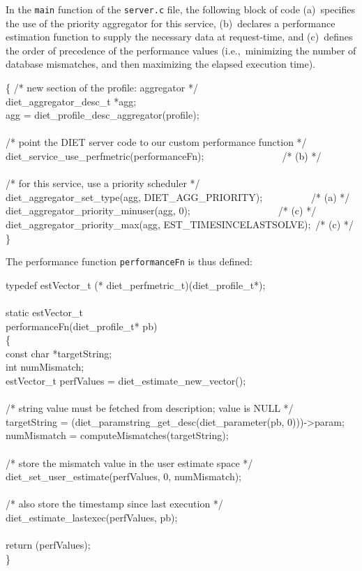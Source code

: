 In the \texttt{main} function of the \texttt{server.c} file, the
following block of code (a)~specifies the use of the priority
aggregator for this service, (b)~declares a performance estimation
function to supply the necessary data at request-time, and
(c)~defines the order of precedence of the performance values
(i.e.,~minimizing the number of database mismatches, and then
maximizing the elapsed execution time).
\begin{code}
  \{
    /* new section of the profile: aggregator */ \\
    diet\_aggregator\_desc\_t *agg; \\
    agg = diet\_profile\_desc\_aggregator(profile); \\
\\
    /* point the DIET server code to our custom performance function */ \\
    diet\_service\_use\_perfmetric(performanceFn);~~~~~~~~~~~~~~~~/* (b) */ \\
\\
    /* for this service, use a priority scheduler */ \\
    diet\_aggregator\_set\_type(agg, DIET\_AGG\_PRIORITY);~~~~~~~~~~/* (a) */ \\
    diet\_aggregator\_priority\_minuser(agg, 0);~~~~~~~~~~~~~~~~~~/* (c) */ \\
    diet\_aggregator\_priority\_max(agg, EST\_TIMESINCELASTSOLVE);~/* (c) */ \\
  \}
\end{code}
The performance function \texttt{performanceFn} is thus defined:
\begin{code}
typedef estVector\_t (* diet\_perfmetric\_t)(diet\_profile\_t*); \\
\\
static estVector\_t \\
performanceFn(diet\_profile\_t* pb) \\
\{ \\
  const char *targetString; \\
  int numMismatch; \\
  estVector\_t perfValues = diet\_estimate\_new\_vector(); \\
\\
  /* string value must be fetched from description; value is NULL */ \\
  targetString = (diet\_paramstring\_get\_desc(diet\_parameter(pb, 0)))->param; \\
  numMismatch = computeMismatches(targetString); \\
\\
  /* store the mismatch value in the user estimate space */ \\
  diet\_set\_user\_estimate(perfValues, 0, numMismatch); \\
\\
  /* also store the timestamp since last execution */ \\
  diet\_estimate\_lastexec(perfValues, pb); \\
\\
  return (perfValues); \\
\}
\end{code}
